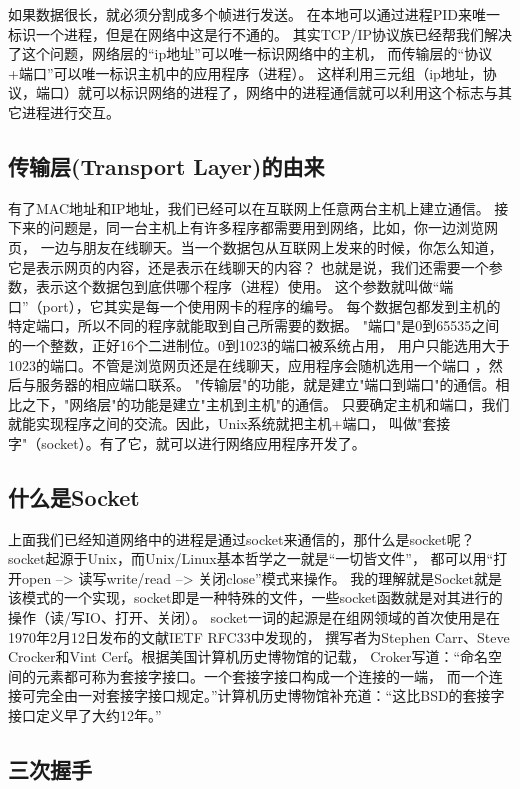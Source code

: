 \documentclass{book}
\begin{document}
如果数据很长，就必须分割成多个帧进行发送。
在本地可以通过进程PID来唯一标识一个进程，但是在网络中这是行不通的。
其实TCP/IP协议族已经帮我们解决了这个问题，网络层的“ip地址”可以唯一标识网络中的主机，
而传输层的“协议+端口”可以唯一标识主机中的应用程序（进程）。
这样利用三元组（ip地址，协议，端口）就可以标识网络的进程了，网络中的进程通信就可以利用这个标志与其它进程进行交互。

\subsection{传输层(Transport Layer)的由来}

有了MAC地址和IP地址，我们已经可以在互联网上任意两台主机上建立通信。
接下来的问题是，同一台主机上有许多程序都需要用到网络，比如，你一边浏览网页，
一边与朋友在线聊天。当一个数据包从互联网上发来的时候，你怎么知道，它是表示网页的内容，还是表示在线聊天的内容？
也就是说，我们还需要一个参数，表示这个数据包到底供哪个程序（进程）使用。
这个参数就叫做“端口”（port），它其实是每一个使用网卡的程序的编号。
每个数据包都发到主机的特定端口，所以不同的程序就能取到自己所需要的数据。
"端口"是0到65535之间的一个整数，正好16个二进制位。0到1023的端口被系统占用，
用户只能选用大于1023的端口。不管是浏览网页还是在线聊天，应用程序会随机选用一个端口
，然后与服务器的相应端口联系。
"传输层"的功能，就是建立"端口到端口"的通信。相比之下，"网络层"的功能是建立"主机到主机"的通信。
只要确定主机和端口，我们就能实现程序之间的交流。因此，Unix系统就把主机+端口，
叫做"套接字"（socket）。有了它，就可以进行网络应用程序开发了。

\subsection{什么是Socket}

上面我们已经知道网络中的进程是通过socket来通信的，那什么是socket呢？
socket起源于Unix，而Unix/Linux基本哲学之一就是“一切皆文件”，
都可以用“打开open –> 读写write/read –> 关闭close”模式来操作。
我的理解就是Socket就是该模式的一个实现，socket即是一种特殊的文件，一些socket函数就是对其进行的操作（读/写IO、打开、关闭）。
socket一词的起源是在组网领域的首次使用是在1970年2月12日发布的文献IETF RFC33中发现的，
撰写者为Stephen Carr、Steve Crocker和Vint Cerf。根据美国计算机历史博物馆的记载，
Croker写道：“命名空间的元素都可称为套接字接口。一个套接字接口构成一个连接的一端，
而一个连接可完全由一对套接字接口规定。”计算机历史博物馆补充道：“这比BSD的套接字接口定义早了大约12年。”

\subsection{三次握手}
\end{document}
